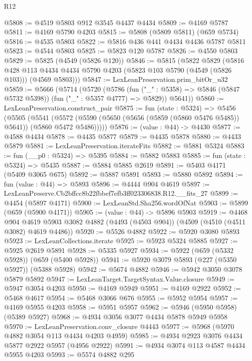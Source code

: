 \begin{lexlean}{R12}
\begin{coremodule}
@5808 := @4519 @5803 @912 @3545 @4437 @4434
@5809 := @4169 @5787
@5811 := @4169 @5790 @4203
@5815 := @5808 (@5809 @5811) (@659 @5734)
@5816 := @4535 @5803
@5822 := @5816 @436 @441 @4434 @4436 @5787 @5811
@5823 := @4544 @5803
@5825 := @5823 @120 @5787
@5826 := @4550 @5803
@5829 := @5825 (@4549 (@5826 @120))
@5846 := @5815
    (@5822
      @5829
      (@5816
        @428
        @113
        @4434
        @4434
        @5790
        @4203
        (@5823 @103 @5790 (@4549 (@5826 @103)))
        (@4569 @5803)))
@5847 := LexLeanPreservation.prim_bitOr_u32
@5859 := @5666
    (@5714
      (@5720
        (@5786 (fun ("_" : @5358) => @5846 (@5847 @5732 @5398)) (fun ("_" : @5357 @4777) => @5829))
        @5641))
@5860 := LexLeanPreservation.construct_pair
@5875 := fun (state : @5324) =>
  @5456
    (@5505
      (@5541 (@5572 (@5590 (@5650 (@5656 (@5859 (@5860 @5476 @5485)) @5641)) (@5860 @5472 @5486)))))
@5876 := (value : @44) -> @4430
@5877 := @4588 @4434
@5878 := @4435 @5877
@5879 := @4435 @5878
@5880 := @4433 @5879
@5881 := LexLeanPreservation.iterateFits
@5882 := @5881 @5324
@5883 := fun (__p0 : @5324) => @5395
@5884 := @5882 @5883
@5885 := fun (state : @5324) => @5435
@5887 := @5884 @5885 @2619
@5891 := @5403 @4171 (@5409 @3065 @675)
@5892 := @5887 @5891
@5893 := @5880 @5892
@5894 := fun (value : @44) => @5893
@5896 := @4444 @904 @4619
@5897 := LexLeanPreserve.Cb2bffcc8b22fbbef7efb3ff023306838.R12.__fits_27
@5899 := @4454 (@5897 @4171)
@5900 := LexLeanStd.Sha256.wordOfNat
@5903 := @5899 (@659 (@5900 @4171))
@5905 := (value : @44) -> @5896 @5903
@5919 := @4468
    @904
    @4619
    @5903
    @3082
    @4882
    (@4493 (@4503 @904))
    (@4509 (@4510 (@4511 @3082) @4619 @4486))
@5920 := @5526 @4882
@5922 := @5920 @3080 @5893
@5923 := LexLeanCollections.iterate
@5925 := @5923 @5324 @5885
@5927 := @5925 @2619 @5891
@5928 := @5335 @5927
@5934 := @5922 (@659 (@5332 @5928)) (@659 (@5400 @5928))
@5941 := @5920 @3079 @5893 (@227 (@5350 @5927)) (@5388 @5928)
@5942 := @5674 @4882
@5946 := @5942 @3050 @3078 @5879 @5892
@5947 := LexLeanTarget.TargetSyntax.Value.closure
@5949 := @5947 @3054 @4203
@5950 := @4169 @5949
@5951 := @4169 @2922
@5952 := @5468 @4617
@5954 := @5468 @3066 @676
@5955 := @5952 @5954
@5957 := @4169 @5955 @4203
@5958 := @5951 @5957
@5962 := @5946 (@5950 @5958) (@5389 @5927)
@5968 := @4934 @3056 @3077 @4434 @5878 @5949 @5958
@5970 := LexLeanPreservation.conv_closure @4443
@5977 := @5968 (@5970 @4882 @3054 @113 @4434 @4203 @4959)
@5985 := @4934 @2923 @3076 @4434 @5877 @2922 @5957 (@4956 @2922)
@5991 := @4934 @3074 @113 @4587 @4434 @5955 @4203
@5993 := @5574 @4882 @295

\end{coremodule}
\end{lexlean}

